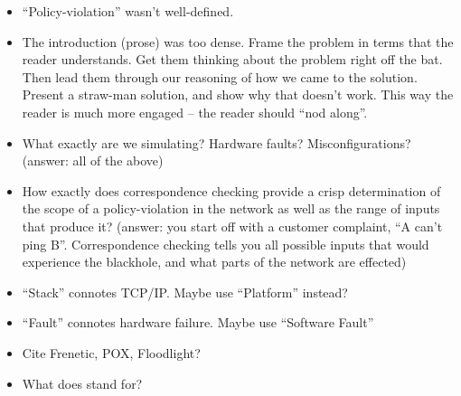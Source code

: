 {\begin{itemize}
there are at a given point (say, in POX).
\item ``Policy-violation'' wasn't well-defined.
\item The introduction (prose) was too dense. Frame the problem in terms that
the reader understands. Get them thinking about the problem right off the bat.
Then lead them through our reasoning of how we came to the solution. Present
a straw-man solution, and show why that doesn't work. This way
the reader is much more engaged -- the reader should ``nod along''.
\item What exactly are we simulating? Hardware faults? Misconfigurations?
(answer: all of the above)
\item How exactly does correspondence checking provide a crisp determination of the scope of a policy-violation in the
network as well as the range of inputs that produce it? (answer: you start off
with a customer complaint, ``A can't ping B''. Correspondence checking tells
you all possible inputs that would experience the blackhole, and what parts of
the network are effected)
\item ``Stack'' connotes TCP/IP. Maybe use ``Platform'' instead?
\item ``Fault'' connotes hardware failure. Maybe use ``Software Fault''
\item Cite Frenetic, POX, Floodlight?
\item What does \projectname{} stand for?
\end{itemize}
}
